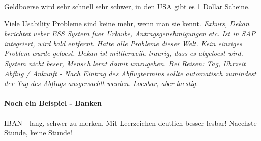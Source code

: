 Geldboerse wird sehr schnell sehr schwer, in den USA gibt es 1 Dollar Scheine.

Viele Usability Probleme sind keine mehr, wenn man sie kennt. \textit{Exkurs, Dekan 
berichtet ueber ESS System fuer Urlaube, Antragsgenehmigungen etc. Ist in SAP integriert,
wird bald entfernt. Hatte alle Probleme dieser Welt. Kein einziges Problem wurde geloest.
Dekan ist mittlerweile traurig, dass es abgeloest wird. System nicht beser, Mensch lernt
damit umzugehen. Bei Reisen: Tag, Uhrzeit Abflug / Ankunft - Nach Eintrag des Abflugtermins
sollte automatisch zumindest der Tag des Abflugs ausgewaehlt werden. Loesbar, aber laestig.}

\paragraph{Noch ein Beispiel - Banken}
IBAN - lang, schwer zu merken. Mit Leerzeichen deutlich besser lesbar!
Naechste Stunde, keine Stunde!

